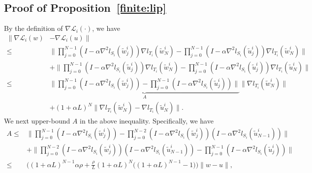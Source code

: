 \documentclass{osudissert96}
\begin{document}
\subsection*{Proof of Proposition~\ref{finite:lip}}
By the definition of $\nabla \mathcal{L}_i(\cdot)$, we have 
	\begin{align}\label{lopasv}
	\|\nabla \mathcal{L}_i(w) & -\nabla \mathcal{L}_i(u) \| \nonumber
	\\\leq &\Big\|\prod_{j=0}^{N-1}(I - \alpha \nabla^2 l_{S_i}(\widetilde w_{j}^i))\nabla l_{T_i}(\widetilde w_{N}^i) -\prod_{j=0}^{N-1}(I - \alpha \nabla^2 l_{S_i}(\widetilde u_{j}^i))\nabla l_{T_i}(\widetilde w_{N}^i)\Big\|  \nonumber
	\\ & + \Big\|\prod_{j=0}^{N-1}(I - \alpha \nabla^2 l_{S_i}(\widetilde u_{j}^i))\nabla l_{T_i}(\widetilde w_{N}^i) -\prod_{j=0}^{N-1}(I - \alpha \nabla^2 l_{S_i}(\widetilde u_{j}^i))\nabla l_{T_i}(\widetilde u_{N}^i)\Big\| \nonumber
	\\ \leq &\underbrace{ \Big\|\prod_{j=0}^{N-1}(I - \alpha \nabla^2 l_{S_i}(\widetilde  w_{j}^i)) -\prod_{j=0}^{N-1}(I - \alpha \nabla^2 l_{S_i}(\widetilde u_{j}^i))\Big\|}_{A}  \|\nabla l_{T_i}(\widetilde  w_{N}^i)\|  \nonumber
	\\& + (1+\alpha L)^N \|\nabla l_{T_i}(\widetilde w_{N}^i)- \nabla l_{T_i}(\widetilde  u_{N}^i)\|.
	\end{align}
	We next upper-bound $A$ in the above inequality. Specifically,  we have
	\begin{align}\label{alegeq}
	A \leq &  \Big\|\prod_{j=0}^{N-1}(I - \alpha \nabla^2 l_{S_i}(\widetilde w_{j}^i)) -\prod_{j=0}^{N-2}(I - \alpha \nabla^2 l_{S_i}(\widetilde w_{j}^i))(I - \alpha \nabla^2 l_{S_i}(\widetilde u_{N-1}^i))\Big\| \nonumber
	\\ &+\Big\| \prod_{j=0}^{N-2}(I - \alpha \nabla^2 l_{S_i}(\widetilde w_{j}^i))(I - \alpha \nabla^2 l_{S_i}(\widetilde u_{N-1}^i))-\prod_{j=0}^{N-1}(I - \alpha \nabla^2 l_{S_i}(\widetilde u_{j}^i))\Big\|\nonumber
	\\ \leq &\Big(   (1+\alpha  L)^{N-1}\alpha \rho  + \frac{\rho}{L} (1+\alpha L)^N \big( (1+\alpha L)^{N-1} -1 \big)\Big)\|w-u\|,
	\end{align}
\end{document}

